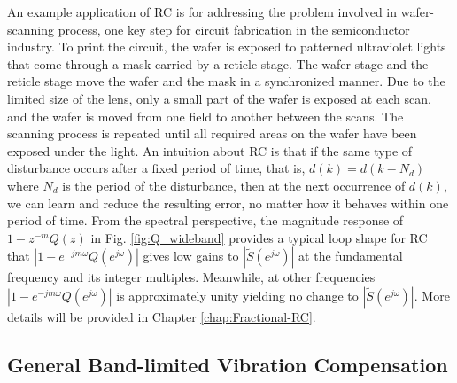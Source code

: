 \documentclass [11pt, proquest] {uwthesis}[2020/02/24]
\begin{document}
An example application of RC is for addressing the
problem involved in wafer-scanning process, one key step for circuit
fabrication in the semiconductor industry. To print the circuit, the
wafer is exposed to patterned ultraviolet lights that come through
a mask carried by a reticle stage. The wafer stage and the reticle
stage move the wafer and the mask in a synchronized manner. Due to
the limited size of the lens, only a small part of the wafer is exposed
at each scan, and the wafer is moved from one field to another between
the scans. The scanning process is repeated until all required areas
on the wafer have been exposed under the light. An intuition about
RC is that if the same type of disturbance occurs
after a fixed period of time, that is, $d(k)=d(k-N_{d})$ where $N_{d}$
is the period of the disturbance, then at the next occurrence of $d(k)$,
we can learn and reduce the resulting error, no matter how it behaves
within one period of time. From the spectral perspective, the magnitude
response of $1-z^{-m}Q(z)$ in Fig. \ref{fig:Q_wideband}
provides a typical loop shape for RC that $|1-e^{-jm\omega}Q(e^{j\omega})|$
gives low gains to $|\tilde{S}(e^{j\omega})|$ at the fundamental
frequency and its integer multiples. Meanwhile, at other frequencies
$|1-e^{-jm\omega}Q(e^{j\omega})|$ is approximately unity yielding
no change to $|\tilde{S}(e^{j\omega})|$. More details will be provided in Chapter \ref{chap:Fractional-RC}.

\subsection{General Band-limited Vibration Compensation}
\end{document}
